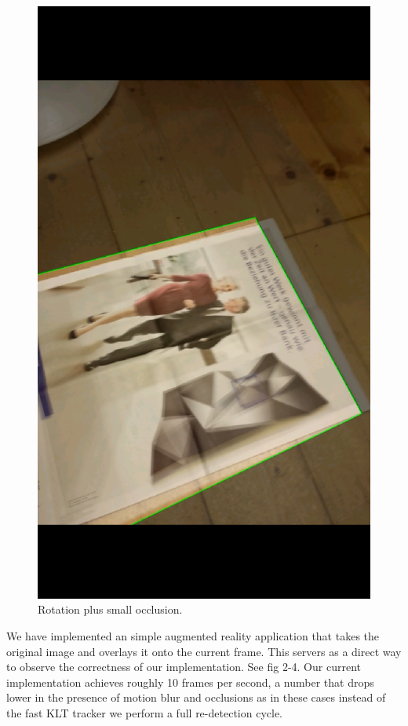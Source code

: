 \documentclass[10pt,conference,compsocconf]{IEEEtran}
\begin{document}
\begin{figure}[t]
\begin{minipage}[t]{0.33\textwidth}
        \includegraphics[width=\columnwidth]{Screenshot_2014-01-21-23-00-03.png}
        \caption{Rotation plus small occlusion.}
        \label{fig:rot_occl}
    \end{minipage}
    \hspace{0.0cm}
\end{figure}
We have implemented an simple augmented reality application that takes the original image and overlays it onto the current frame. This servers as a direct way to observe the correctness of our implementation. See fig 2-4. Our current implementation achieves roughly 10 frames per second, a number that drops lower in the presence of motion blur and occlusions as in these cases instead of the fast KLT tracker we perform a full re-detection cycle. 
\end{document}
